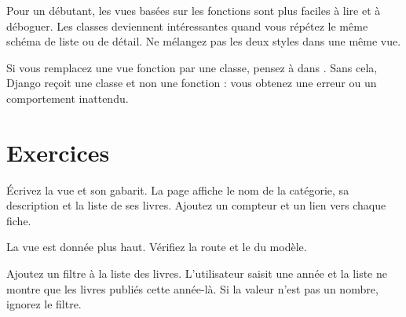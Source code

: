 \begin{bonne}
Pour un débutant, les vues basées sur les fonctions sont plus faciles à lire et à
déboguer. Les classes deviennent intéressantes quand vous répétez le même schéma
de liste ou de détail. Ne mélangez pas les deux styles dans une même vue.
\end{bonne}

\begin{piege}
Si vous remplacez une vue fonction par une classe, pensez à  dans
. Sans cela, Django reçoit une classe et non une fonction : vous
obtenez une erreur  ou un comportement inattendu.
\end{piege}

\section{Exercices}

\begin{exercice}
Écrivez la vue  et son gabarit. La page affiche le nom de
la catégorie, sa description et la liste de ses livres. Ajoutez un compteur et un
lien vers chaque fiche.
\end{exercice}

\begin{correction}

La vue est donnée plus haut. Vérifiez la route
 et le  du modèle.
\end{correction}

\begin{exercice}
Ajoutez un filtre  à la liste des livres. L'utilisateur saisit une
année et la liste ne montre que les livres publiés cette année-là. Si la valeur
n'est pas un nombre, ignorez le filtre.
\end{exercice}

